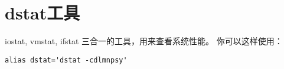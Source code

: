 \section{dstat工具}
iostat, vmstat, ifstat 三合一的工具，用来查看系统性能。
你可以这样使用：

\begin{verbatim}
alias dstat='dstat -cdlmnpsy'
\end{verbatim}


